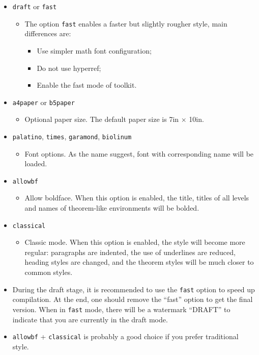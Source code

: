 \documentclass[puretext]{simplivre}
\newenvironment{tip}[1][Tip]{%
    \LocallyStopLineNumbers%
    \begin{tcolorbox}[breakable,
        enhanced,
        width = \textwidth,
        colback = paper, colbacktitle = paper,
        colframe = gray!50, boxrule=0.2mm,
        coltitle = black,
        fonttitle = \sffamily,
        attach boxed title to top left = {yshift=-\tcboxedtitleheight/2, xshift=.5cm},
        boxed title style = {boxrule=0pt, colframe=paper},
        before skip = 0.3cm,
        after skip = 0.3cm,
        top = 3mm,
        bottom = 3mm,
        title={\scshape\sffamily #1}]%
}{\end{tcolorbox}\ResumeLineNumbers}
\begin{document}
\begin{itemize}
    \item \texttt{draft} or \texttt{fast}
        \begin{itemize}
            \item The option \verb|fast| enables a faster but slightly rougher style, main differences are:
            \begin{itemize}
                \item Use simpler math font configuration; 
                \item Do not use hyperref; 
                \item Enable the fast mode of \ProjLib{} toolkit.
            \end{itemize}
        \end{itemize}
    \item \texttt{a4paper} or \texttt{b5paper}
        \begin{itemize}
            \item Optional paper size. The default paper size is 7in $\times$ 10in.
        \end{itemize}
        \item \texttt{palatino}, \texttt{times}, \texttt{garamond}, \texttt{biolinum}
            \begin{itemize}
                \item Font options. As the name suggest, font with corresponding name will be loaded.
            \end{itemize}
    \item \texttt{allowbf}
        \begin{itemize}
            \item Allow boldface. When this option is enabled, the title, titles of all levels and names of theorem-like environments will be bolded.
        \end{itemize}
    \item \texttt{classical}
        \begin{itemize}
            \item Classic mode. When this option is enabled, the style will become more regular: paragraphs are indented, the use of underlines are reduced, heading styles are changed, and the theorem styles will be much closer to common styles.
        \end{itemize}
\end{itemize}

\begin{tip}
    \begin{itemize}
        \item During the draft stage, it is recommended to use the \verb|fast| option to speed up compilation. At the end, one should remove the ``fast'' option to get the final version. When in \verb|fast| mode, there will be a watermark ``DRAFT'' to indicate that you are currently in the draft mode.
        \item \texttt{allowbf} + \texttt{classical} is probably a good choice if you prefer traditional style.
    \end{itemize}
\end{tip}
\end{document}
